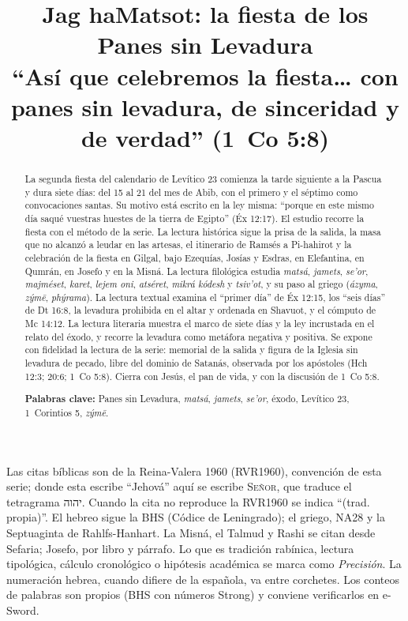 \documentclass[11pt,letterpaper]{article}
\title{\color{tierraroja}\bfseries Jag haMatsot: la fiesta de los Panes sin Levadura\\[4pt]\large\color{sepia}\mdseries ``Así que celebremos la fiesta\ldots{} con panes sin levadura, de sinceridad y de verdad'' (1~Co 5:8)}
\author{}\date{}
\newcommand{\heb}[1]{\mbox{\foreignlanguage{hebrew}{#1}}}
\newcommand{\SENOR}{\textsc{Señor}}
\begin{document}
\maketitle\thispagestyle{empty}

\begin{abstract}\noindent
La segunda fiesta del calendario de Levítico 23 comienza la tarde siguiente a la Pascua y dura siete días: del 15 al 21 del mes de Abib, con el primero y el séptimo como convocaciones santas. Su motivo está escrito en la ley misma: ``porque en este mismo día saqué vuestras huestes de la tierra de Egipto'' (Éx 12:17). El estudio recorre la fiesta con el método de la serie. La lectura histórica sigue la prisa de la salida, la masa que no alcanzó a leudar en las artesas, el itinerario de Ramsés a Pi-hahirot y la celebración de la fiesta en Gilgal, bajo Ezequías, Josías y Esdras, en Elefantina, en Qumrán, en Josefo y en la Misná. La lectura filológica estudia \emph{matsá}, \emph{jamets}, \emph{se'or}, \emph{majméset}, \emph{karet}, \emph{lejem oni}, \emph{atséret}, \emph{mikrá kódesh} y \emph{tsiv'ot}, y su paso al griego (\emph{ázyma}, \emph{zýmē}, \emph{phýrama}). La lectura textual examina el ``primer día'' de Éx 12:15, los ``seis días'' de Dt 16:8, la levadura prohibida en el altar y ordenada en Shavuot, y el cómputo de Mc 14:12. La lectura literaria muestra el marco de siete días y la ley incrustada en el relato del éxodo, y recorre la levadura como metáfora negativa y positiva. Se expone con fidelidad la lectura de la serie: memorial de la salida y figura de la Iglesia sin levadura de pecado, libre del dominio de Satanás, observada por los apóstoles (Hch 12:3; 20:6; 1~Co 5:8). Cierra con Jesús, el pan de vida, y con la discusión de 1~Co 5:8.
\par\smallskip\noindent\textbf{Palabras clave:} Panes sin Levadura, \emph{matsá}, \emph{jamets}, \emph{se'or}, éxodo, Levítico 23, 1~Corintios 5, \emph{zýmē}.\end{abstract}

\begin{nota}
Las citas bíblicas son de la Reina-Valera 1960 (RVR1960), convención de esta serie; donde esta escribe ``Jehová'' aquí se escribe \SENOR, que traduce el tetragrama \heb{יהוה}. Cuando la cita no reproduce la RVR1960 se indica ``(trad. propia)''. El hebreo sigue la BHS (Códice de Leningrado); el griego, NA28 y la Septuaginta de Rahlfs-Hanhart. La Misná, el Talmud y Rashi se citan desde Sefaria; Josefo, por libro y párrafo. Lo que es tradición rabínica, lectura tipológica, cálculo cronológico o hipótesis académica se marca como \emph{Precisión}. La numeración hebrea, cuando difiere de la española, va entre corchetes. Los conteos de palabras son propios (BHS con números Strong) y conviene verificarlos en e-Sword.
\end{nota}
\end{document}
